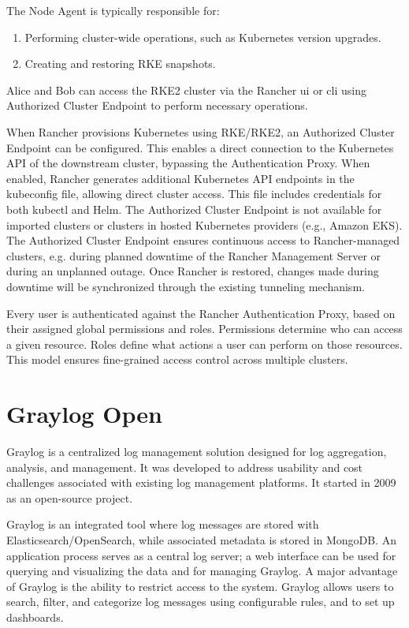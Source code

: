 \documentclass[../main.tex]{subfiles}
\begin{document}
The Node Agent is typically responsible for:

\begin{enumerate}
    \item Performing cluster-wide operations, such as Kubernetes version upgrades.
    \item Creating and restoring RKE snapshots. 
\end{enumerate}
Alice and Bob can access the RKE2 cluster via the Rancher \gls{ui} or \gls{cli} using Authorized Cluster Endpoint to perform necessary operations.  

When Rancher provisions Kubernetes using RKE/RKE2, an Authorized Cluster Endpoint can be configured. This enables a direct connection to the Kubernetes API of the downstream cluster, bypassing the Authentication Proxy. When enabled, Rancher generates additional Kubernetes API endpoints in the kubeconfig file, allowing direct cluster access. This file includes credentials for both kubectl and Helm. The Authorized Cluster Endpoint is not available for imported clusters or clusters in hosted Kubernetes providers (e.g., Amazon EKS).
The Authorized Cluster Endpoint ensures continuous access to Rancher-managed clusters, e.g. during planned downtime of the Rancher Management Server or during an unplanned outage. Once Rancher is restored, changes made during downtime will be synchronized through the existing tunneling mechanism.

Every user is authenticated against the Rancher Authentication Proxy, based on their assigned global permissions and roles. Permissions determine who can access a given resource. Roles define what actions a user can perform on those resources. This model ensures fine-grained access control across multiple clusters. \cite{rancherbasics}
\section{Graylog Open}
Graylog is a centralized log management solution designed for log aggregation, analysis, and management. It was developed to address usability and cost challenges associated with existing log management platforms. It started in 2009 as an open-source project.

Graylog is an integrated tool where log messages are stored with Elasticsearch/OpenSearch, while associated metadata is stored in MongoDB. An application process serves as a central log server; a web interface can be used for querying and visualizing the data and for managing Graylog. A major advantage of Graylog is the ability to restrict access to the system. Graylog allows users to search, filter, and categorize log messages using configurable rules, and to set up dashboards. \cite{hopf2016elasticsearch}
\end{document}

